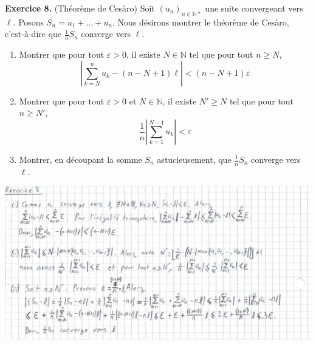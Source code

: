 \documentclass[a4paper, 10pt]{report}
\begin{document}
	\vspace{5mm}
	\noindent
	\textbf{Exercice 8.} (Théorème de Cesàro)
	Soit $(u_n)_{n \in \mathbb{N}*}$ une suite convergeant vers $\ell$.
	Posons $S_n = u_1 + \dotso + u_n$. Nous désirons montrer le théorème
	de Cesàro, c'est-à-dire que $\frac{1}{n}S_n$ converge vers $\ell$. 
	\begin{enumerate}[label=(\roman*)]
		\item Montrer que pour tout $\varepsilon > 0$, il existe
		$N \in \mathbb{N}$ tel que pour tout $n \geq N$,
		\[\left|\sum_{k=N}^{n}u_k - (n - N + 1)\ell\right| < (n - N + 1)\varepsilon\]
		\item Montrer que pour tout $\varepsilon > 0$ et $N \in \mathbb{N}$,
		il existe $N' \geq N$ tel que pour tout $n \geq N'$,
		\[\frac{1}{n}\left|\sum_{k=1}^{N-1}u_k\right| < \varepsilon\]
		\item Montrer, en découpant la somme $S_n$ astucieusement, que
		$\frac{1}{n}S_n$ converge vers $\ell$.\\
	\end{enumerate}
	
	\includegraphics{ex08.jpg}
	
	
%	
%	
%	
	
\end{document}
